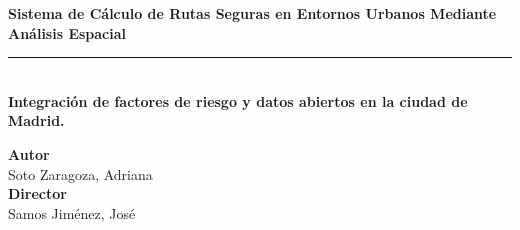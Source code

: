 \begin{titlepage}
 
 
\setlength{\centeroffset}{-0.5\oddsidemargin}
\addtolength{\centeroffset}{0.5\evensidemargin}
\thispagestyle{empty}

\noindent\hspace*{\centeroffset}\begin{minipage}{\textwidth}

\centering



\vspace{3.3cm}

\vspace{0.5cm}


{\Huge\bfseries Sistema de Cálculo de Rutas Seguras en Entornos Urbanos Mediante Análisis Espacial\\
}
\noindent\rule[-1ex]{\textwidth}{3pt}\\[3.5ex]
{\large\bfseries Integración de factores de riesgo y datos abiertos en la ciudad de Madrid.}\\[4cm]
\end{minipage}

\vspace{2.5cm}
\noindent\hspace*{\centeroffset}\begin{minipage}{\textwidth}
\centering

\textbf{Autor}\\ {Soto Zaragoza, Adriana}\\[2.5ex]
\textbf{Director}\\
{Samos Jiménez, José}\\[2cm]
\end{minipage}

 
\end{titlepage}


